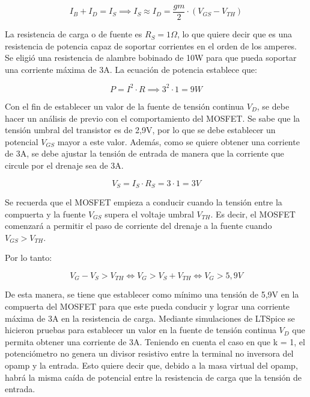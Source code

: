 \documentclass[12pt,oneside,a4paper]{article}
\begin{document}
\begin{equation}
    I_B + I_D = I_S \implies I_S \approx I_D = \frac{gm}{2} \cdot (V_{GS} - V_{TH})
\end{equation}

La resistencia de carga o de fuente es $R_S = 1\Omega$, lo que quiere decir que es una resistencia 
de potencia capaz de soportar corrientes en el orden de los amperes. Se eligió una resistencia de 
alambre bobinado de 10W para que pueda soportar una corriente máxima de 3A. La ecuación de potencia 
establece que:

\begin{equation}
    P = I^2 \cdot R \implies 3^2 \cdot 1 = 9W
\end{equation}

Con el fin de establecer un valor de la fuente de tensión continua $V_D$, se debe hacer un análisis de 
previo con el comportamiento del MOSFET. Se sabe que la tensión umbral del transistor es de 2,9V,
por lo que se debe establecer un potencial $V_{GS}$ mayor a este valor. Además, 
como se quiere obtener una corriente de 3A, se debe ajustar la tensión de entrada de manera que 
la corriente que circule por el drenaje sea de 3A.

\begin{equation}
    V_S = I_S \cdot R_S = 3 \cdot 1 = 3V
\end{equation}

Se recuerda que el MOSFET empieza a conducir cuando la tensión entre la compuerta y la fuente $V_{GS}$ supera el 
voltaje umbral $V_{TH}$. Es decir, el MOSFET comenzará a permitir el paso de corriente del drenaje a la fuente 
cuando $V_{GS} > V_{TH}$. 

Por lo tanto:

\begin{equation}
    V_G - V_S > V_{TH} \iff V_G > V_S + V_{TH} \iff V_G > 5,9V
\end{equation}

De esta manera, se tiene que establecer como mínimo una tensión de 5,9V en la compuerta del MOSFET para que 
este pueda conducir y lograr una corriente máxima de 3A en la resistencia de carga. Mediante simulaciones 
de LTSpice se hicieron pruebas para establecer un valor en la fuente de tensión continua $V_D$ que permita
obtener una corriente de 3A. Teniendo en cuenta el caso en que k = 1, el potenciómetro no genera 
un divisor resistivo entre la terminal no inversora del opamp y la entrada. Esto quiere decir que, 
debido a la masa virtual del opamp, habrá la misma caída de potencial entre la resistencia de 
carga que la tensión de entrada. 
\end{document}
